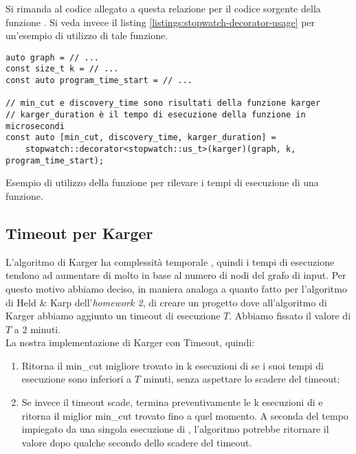 \noindent Si rimanda al codice allegato a questa relazione per il codice sorgente della funzione . Si veda invece il listing
\ref{listings:stopwatch-decorator-usage} per un'esempio di utilizzo di
tale funzione.

\begin{listing}[!ht]
\begin{verbatim}
auto graph = // ...
const size_t k = // ...
const auto program_time_start = // ...

// min_cut e discovery_time sono risultati della funzione karger
// karger_duration è il tempo di esecuzione della funzione in microsecondi
const auto [min_cut, discovery_time, karger_duration] =
    stopwatch::decorator<stopwatch::us_t>(karger)(graph, k, program_time_start);

\end{verbatim}
\caption{Esempio di utilizzo della funzione  per
  rilevare i tempi di esecuzione di una funzione.}
\label{listings:stopwatch-decorator-usage}
\end{listing}

\subsection{Timeout per Karger}

\noindent L'algoritmo di Karger ha complessità temporale
\complexityKargerTime{}, quindi i tempi di esecuzione tendono ad
aumentare di molto in base al numero di nodi del grafo di input. Per
questo motivo abbiamo deciso, in maniera analoga a quanto fatto per
l'algoritmo di Held \& Karp dell'\emph{homework 2}, di creare un progetto
dove all'algoritmo di Karger abbiamo aggiunto un timeout di esecuzione
$T$. Abbiamo fissato il valore di $T$ a 2 minuti.\\

\noindent La nostra implementazione di Karger con Timeout, quindi:

\begin{enumerate}
    \item Ritorna il min\_cut migliore trovato in k esecuzioni di
       se i suoi tempi di esecuzione
      sono inferiori a $T$ minuti, senza aspettare lo scadere del
      timeout;
    \item Se invece il timeout scade, termina preventivamente le k
      esecuzioni di  e ritorna il
      miglior min\_cut trovato fino a quel momento. A seconda del
      tempo impiegato da una singola esecuzione di
      , l'algoritmo potrebbe ritornare
      il valore dopo qualche secondo dello scadere del timeout.
\end{enumerate}

